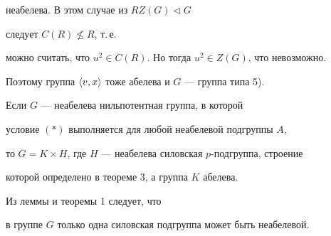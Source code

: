 неабелева. В этом случае из $R Z(G)\triangleleft G$


следует $C(R)\not\le R$, т.\,е.


можно считать, что $u^2\in C(R)$. Но тогда $u^2\in Z(G)$, что невозможно.


Поэтому группа $\langle v,x\rangle$ тоже абелева и $G$ --- группа типа 5).





\begin{cornonum}


Если $G$ --- неабелева нильпотентная группа, в которой


условие $(\ast)$ выполняется для любой неабелевой подгруппы $A$,


то $G=K\times H$, где $H$ --- неабелева силовская $p$-подгруппа, строение


которой определено в теореме 3, а группа $K$ абелева.


\end{cornonum}





\begin{pf}


Из леммы и теоремы 1 следует, что


в группе $G$ только одна силовская подгруппа может быть неабелевой.


\end{pf}





